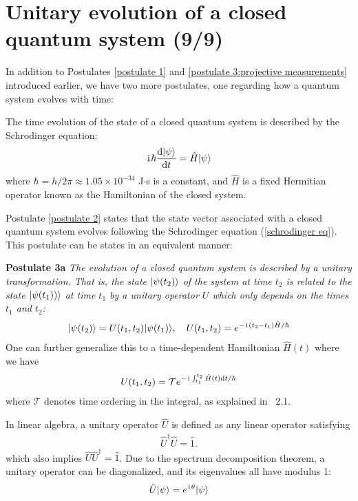 \section{Unitary evolution of a closed quantum system (9/9)}


In addition to Postulates \ref{postulate 1} and \ref{postulate 3:projective measurements} introduced earlier, we have two more postulates, one regarding how a quantum system evolves with time:
\begin{pos}\label{postulate 2}
    The time evolution of the state of a closed quantum system is described by the Schrodinger equation:
    \begin{align}\label{schrodinger eq}
    \hspace{1pt}\mathrm{i}\hspace{1pt}\hbar\frac{\text{d}|{\psi}\rangle}{\text{d}t}=\hat H|{\psi}\rangle
    \end{align}
    where $\hbar=h/2\pi\approx1.05\times10^{-34}$ J$\cdot$s is a constant, and $\hat H$ is a fixed Hermitian operator known as the Hamiltonian of the closed system.
\end{pos}

Postulate \ref{postulate 2} states that the state vector associated with a closed quantum system evolves following the Schrodinger equation (\ref{schrodinger eq}). This postulate can be states in an equivalent manner:

\textbf{Postulate 3a} \emph{The evolution of a closed quantum system is described by a unitary transformation. That is, the state $|{\psi(t_2)}\rangle$ of the system at time $t_2$ is related to the state $|{\psi(t_1))}\rangle$ at time $t_1$ by a unitary operator $U$ which only depends on the times $t_1$ and $t_2$:}
\begin{align}
|{\psi(t_2)}\rangle=U(t_1,t_2)|{\psi(t_1)}\rangle,~~~U(t_1,t_2)=e^{-\hspace{1pt}\mathrm{i}\hspace{1pt}(t_2-t_1)\hat H/\hbar}
\end{align}
One can further generalize this to a time-dependent Hamiltonian $\hat H(t)$ where we have
\begin{align}
U(t_1,t_2)=\mathcal{T}e^{-\hspace{1pt}\mathrm{i}\hspace{1pt}\int_{t_1}^{t_2}\hat H(t)\text{d}t/\hbar}
\end{align}
where $\mathcal{T}$ denotes time ordering in the integral, as explained in \sakurai~2.1.

In linear algebra, a unitary operator $\hat U$ is defined as any linear operator satisfying
\begin{align}
\hat U^\dagger\hat U=\hat 1.
\end{align}
which also implies $\hat U\hat U^\dagger=\hat 1$. Due to the spectrum decomposition theorem, a unitary operator can be diagonalized, and its eigenvalues all have modulus 1:
\begin{align}
\hat U|{\psi}\rangle=e^{\hspace{1pt}\mathrm{i}\hspace{1pt}\theta}|{\psi}\rangle
\end{align}

